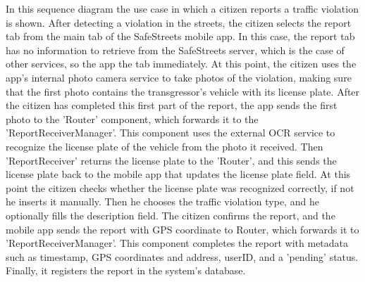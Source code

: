In this sequence diagram the use case in which a citizen reports a traffic violation is shown. After detecting a violation in the streets, the citizen selects the report tab from the main tab of the SafeStreets mobile app. In this case, the report tab has no information to retrieve from the SafeStreets server, which is the case of other services, so the app the tab immediately. At this point, the citizen uses the app's internal photo camera service to take photos of the violation, making sure that the first photo contains the transgressor's vehicle with its license plate. After the citizen has completed this first part of the report, the app sends the first photo to the 'Router' component, which forwards it to the 'ReportReceiverManager'. This component uses the external OCR service to recognize the license plate of the vehicle from the photo it received. Then 'ReportReceiver' returns the license plate to the 'Router', and this sends the license plate back to the mobile app that updates the license plate field. At this point the citizen checks whether the license plate was recognized correctly, if not he inserts it manually. Then he chooses the traffic violation type, and he optionally fills the description field. The citizen confirms the report, and the mobile app sends the report with GPS coordinate to Router, which forwards it to 'ReportReceiverManager'. This component completes the report with metadata such as timestamp, GPS coordinates and address, userID, and a 'pending' status. Finally, it registers the report in the system's database.


